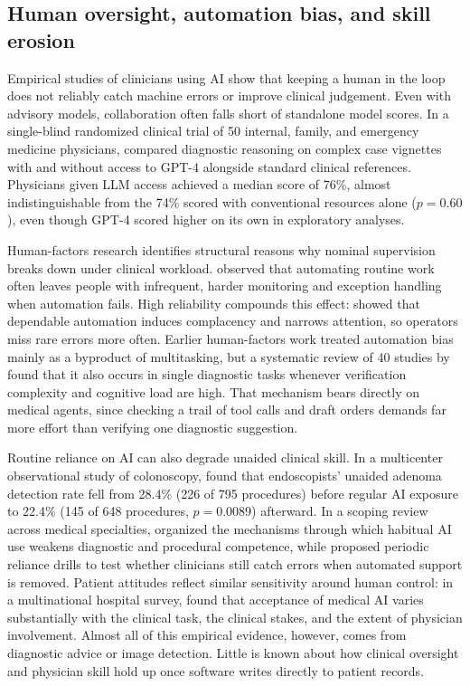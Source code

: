 \subsection{Human oversight, automation bias, and skill erosion}

Empirical studies of clinicians using AI show that keeping a human in the loop does not reliably catch machine errors or improve clinical judgement. Even with advisory models, collaboration often falls short of standalone model scores. In a single-blind randomized clinical trial of 50 internal, family, and emergency medicine physicians, \citet{goh2024diagnostic} compared diagnostic reasoning on complex case vignettes with and without access to GPT-4 alongside standard clinical references. Physicians given LLM access achieved a median score of 76\%, almost indistinguishable from the 74\% scored with conventional resources alone ($p = 0.60$), even though GPT-4 scored higher on its own in exploratory analyses.

Human-factors research identifies structural reasons why nominal supervision breaks down under clinical workload. \citet{bainbridge1983} observed that automating routine work often leaves people with infrequent, harder monitoring and exception handling when automation fails. High reliability compounds this effect: \citet{parasuraman2010} showed that dependable automation induces complacency and narrows attention, so operators miss rare errors more often. Earlier human-factors work treated automation bias mainly as a byproduct of multitasking, but a systematic review of 40 studies by \citet{lyell2017automation} found that it also occurs in single diagnostic tasks whenever verification complexity and cognitive load are high. That mechanism bears directly on medical agents, since checking a trail of tool calls and draft orders demands far more effort than verifying one diagnostic suggestion.

Routine reliance on AI can also degrade unaided clinical skill. In a multicenter observational study of colonoscopy, \citet{budzyn2025deskilling} found that endoscopists' unaided adenoma detection rate fell from 28.4\% (226 of 795 procedures) before regular AI exposure to 22.4\% (145 of 648 procedures, $p = 0.0089$) afterward. In a scoping review across medical specialties, \citet{natali2025deskilling} organized the mechanisms through which habitual AI use weakens diagnostic and procedural competence, while \citet{hunter2024reliance} proposed periodic reliance drills to test whether clinicians still catch errors when automated support is removed. Patient attitudes reflect similar sensitivity around human control: in a multinational hospital survey, \citet{busch2025attitudes} found that acceptance of medical AI varies substantially with the clinical task, the clinical stakes, and the extent of physician involvement. Almost all of this empirical evidence, however, comes from diagnostic advice or image detection. Little is known about how clinical oversight and physician skill hold up once software writes directly to patient records.

